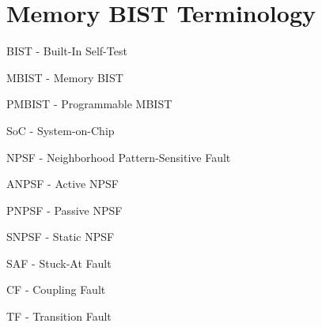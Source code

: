 \section{Memory BIST Terminology}
\label{sect:int-terminology}
BIST - Built-In Self-Test

MBIST - Memory BIST

PMBIST - Programmable MBIST

SoC - System-on-Chip

NPSF - Neighborhood Pattern-Sensitive Fault

ANPSF - Active NPSF

PNPSF - Passive NPSF

SNPSF - Static NPSF

SAF - Stuck-At Fault

CF - Coupling Fault

TF - Transition Fault
